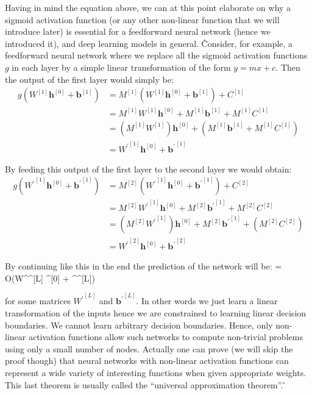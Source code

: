 Having in mind the equation above, we can at this point elaborate on why a sigmoid activation function (or any other
non-linear function that we will introduce later) is essential for a feedforward neural network (hence we introduced
it), and deep learning models in general. \v

Consider, for example, a feedforward neural network where we replace all the sigmoid activation functions $g$ in each
layer by a simple linear transformation of the form $y= mx + c$. Then the output of the first layer would simply be:
\begingroup
\allowdisplaybreaks
\begin{align*}
g(W^{[1]} \boldsymbol{h}^{[0]} + \boldsymbol{b}^{[1]})
&= M^{[1]}(W^{[1]} \boldsymbol{h}^{[0]} + \boldsymbol{b}^{[1]}) + C^{[1]} \\
&= M^{[1]} W^{[1]} \boldsymbol{h}^{[0]} + M^{[1]} \boldsymbol{b}^{[1]} + M^{[1]} C^{[1]} \\
&= (M^{[1]} W^{[1]}) \boldsymbol{h}^{[0]} + (M^{[1]} \boldsymbol{b}^{[1]} + M^{[1]} C^{[1]}) \\
& = {W^\prime}^{[1]} \boldsymbol{h}^{[0]} + {\boldsymbol{b}^\prime}^{[1]}
\end{align*}
\endgroup

By feeding this output of the first layer to the second layer we would obtain:
\begin{align*}
g({W^\prime}^{[1]} \boldsymbol{h}^{[0]} + {\boldsymbol{b}^\prime}^{[1]})
&= M^{[2]} ({W^\prime}^{[1]} \boldsymbol{h}^{[0]} + {\boldsymbol{b}^\prime}^{[1]}) + C^{[2]} \\
&= M^{[2]} {W^\prime}^{[1]} \boldsymbol{h}^{[0]} + M^{[2]}{\boldsymbol{b}^\prime}^{[1]} + M^{[2]} C^{[2]} \\
&= (M^{[2]} {W^\prime}^{[1]}) \boldsymbol{h}^{[0]} + M^{[2]}{\boldsymbol{b}^\prime}^{[1]} + (M^{[2]} C^{[2]}) \\
& = {W^\prime}^{[2]} \boldsymbol{h}^{[0]} + {\boldsymbol{b}^\prime}^{[2]}
\end{align*}

By continuing like this in the end the prediction of the network will be:
\bse
{} = O({W^\prime}^{[L]} ^{[0]} + {^\prime}^{[L]})
\ese

for some matrices ${W^\prime}^{[L]}$ and ${\boldsymbol{b}^\prime}^{[L]}$. In other words we just learn a linear
transformation of the inputs hence we are constrained to learning linear decision boundaries. We cannot learn
arbitrary decision boundaries. Hence, only non-linear activation functions allow such networks to compute non-trivial
problems using only a small number of nodes. Actually one can prove (we will skip the proof though) that neural
networks with non-linear activation functions can represent a wide variety of interesting functions when given
appropriate weights. This last theorem is usually called the ``universal approximation theorem''. \v


